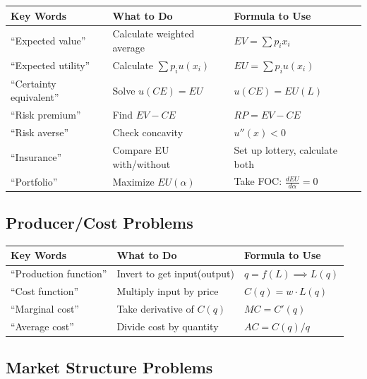\documentclass[10pt,letterpaper]{article}
\begin{document}
\begin{table}[h]
\centering
\begin{tabular}{p{4cm}p{4cm}p{6cm}}
\toprule
\textbf{Key Words} & \textbf{What to Do} & \textbf{Formula to Use} \\
\midrule
``Expected value'' & Calculate weighted average & $EV = \sum p_i x_i$ \\
\midrule
``Expected utility'' & Calculate $\sum p_i u(x_i)$ & $EU = \sum p_i u(x_i)$ \\
\midrule
``Certainty equivalent'' & Solve $u(CE) = EU$ & $u(CE) = EU(L)$ \\
\midrule
``Risk premium'' & Find $EV - CE$ & $RP = EV - CE$ \\
\midrule
``Risk averse'' & Check concavity & $u''(x) < 0$ \\
\midrule
``Insurance'' & Compare EU with/without & Set up lottery, calculate both \\
\midrule
``Portfolio'' & Maximize $EU(\alpha)$ & Take FOC: $\frac{dEU}{d\alpha} = 0$ \\
\bottomrule
\end{tabular}
\end{table}

\subsection{Producer/Cost Problems}

\begin{table}[h]
\centering
\begin{tabular}{p{4cm}p{4cm}p{6cm}}
\toprule
\textbf{Key Words} & \textbf{What to Do} & \textbf{Formula to Use} \\
\midrule
``Production function'' & Invert to get input(output) & $q = f(L) \implies L(q)$ \\
\midrule
``Cost function'' & Multiply input by price & $C(q) = w \cdot L(q)$ \\
\midrule
``Marginal cost'' & Take derivative of $C(q)$ & $MC = C'(q)$ \\
\midrule
``Average cost'' & Divide cost by quantity & $AC = C(q)/q$ \\
\bottomrule
\end{tabular}
\end{table}

\subsection{Market Structure Problems}
\end{document}
